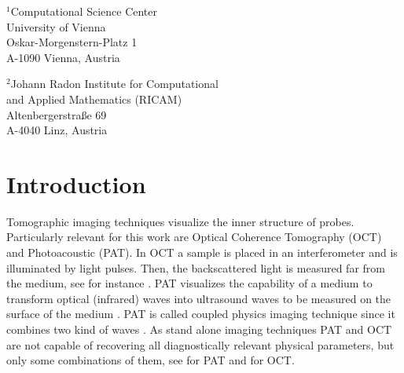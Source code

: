 \documentclass[a4paper,twoside,10pt]{article}
\title{\mytitle}
\author{Peter Elbau$^1$\\{\footnotesize\href{mailto:peter.elbau@univie.ac.at}{peter.elbau@univie.ac.at}}
\and Leonidas Mindrinos$^1$\\{\footnotesize\href{mailto:leonidas.mindrinos@univie.ac.at}{leonidas.mindrinos@univie.ac.at}}
\and Otmar Scherzer$^{1,2}$\\{\footnotesize\href{mailto:otmar.scherzer@univie.ac.at}{otmar.scherzer@univie.ac.at}}}
\theoremstyle{break}
\theoremstyle{nonumberplain}
\begin{document}
\maketitle
\hspace*{1em}
\parbox[t]{0.49\textwidth}{\footnotesize
\hspace*{-1ex}$^1$Computational Science Center\\
University of Vienna\\
Oskar-Morgenstern-Platz 1\\
A-1090 Vienna, Austria}
\parbox[t]{0.4\textwidth}{\footnotesize
\hspace*{-1ex}$^2$Johann Radon Institute for Computational\\
\hspace*{0.1em}and Applied Mathematics (RICAM)\\
Altenbergerstra{\ss}e 69\\
A-4040 Linz, Austria}

\vspace*{2em}

\begin{abstract}
In this paper we perform quantitative reconstruction of the electric susceptibility and the Gr\"uneisen parameter  of a non-magnetic linear dielectric medium using measurement of a multi-modal photoacoustic and optical  coherence tomography system. We consider the mathematical model presented in \cite{ElbMinSch17}, where a Fredholm integral equation of the first kind for the Gr\"uneisen parameter was derived. For the numerical solution of the integral equation we consider a Galerkin type method.
\end{abstract}

\section{Introduction}\label{section_int}

Tomographic imaging techniques visualize the inner structure of probes. Particularly relevant for this work are Optical Coherence Tomography (OCT) and Photoacoustic (PAT). In OCT a sample is placed in an interferometer and is illuminated by light pulses. Then, the backscattered light is measured far from the medium, see for instance \cite{Bre06, DreFuj15, Fer96}. 
PAT visualizes the capability of a medium to transform optical (infrared) waves into ultrasound waves to be measured on the surface of the medium \cite{HalSchBurPal04, Wan08, XuWan06}. PAT is called coupled physics imaging technique since it combines two kind of waves \cite{ArrSch12}.
As stand alone imaging techniques PAT and OCT are not capable of recovering all diagnostically relevant physical parameters, but only some combinations of them, see \cite{BalRen11a} for PAT and \cite{ElbMinSch15} for OCT.
\end{document}
